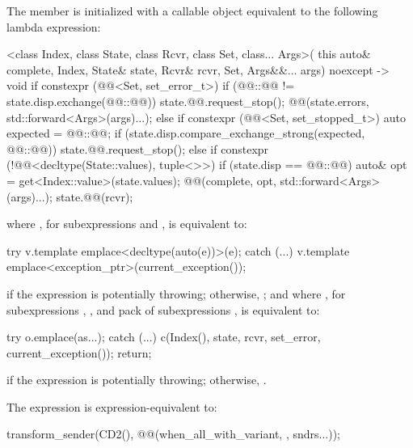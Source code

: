\pnum
The member 
is initialized with a callable object
equivalent to the following lambda expression:
\begin{codeblock}
[]<class Index, class State, class Rcvr, class Set, class... Args>(
    this auto& complete, Index, State& state, Rcvr& rcvr, Set, Args&&... args) noexcept -> void {
  if constexpr (@@<Set, set_error_t>) {
    if (@@::@@ != state.disp.exchange(@@::@@)) {
      state.@@.request_stop();
      @@(state.errors, std::forward<Args>(args)...);
    }
  } else if constexpr (@@<Set, set_stopped_t>) {
    auto expected = @@::@@;
    if (state.disp.compare_exchange_strong(expected, @@::@@)) {
      state.@@.request_stop();
    }
  } else if constexpr (!@@<decltype(State::values), tuple<>>) {
    if (state.disp == @@::@@) {
      auto& opt = get<Index::value>(state.values);
      @@(complete, opt, std::forward<Args>(args)...);
    }
  }
  state.@@(rcvr);
}
\end{codeblock}
where ,
for subexpressions  and , is equivalent to:
\begin{codeblock}
try {
  v.template emplace<decltype(auto(e))>(e);
} catch (...) {
  v.template emplace<exception_ptr>(current_exception());
}
\end{codeblock}
if the expression  is potentially throwing;
otherwise, ;
and where ,
for subexpressions , , and pack of subexpressions ,
is equivalent to:
\begin{codeblock}
try {
  o.emplace(as...);
} catch (...) {
  c(Index(), state, rcvr, set_error, current_exception());
  return;
}
\end{codeblock}
if the expression 
is potentially throwing;
otherwise, .

\pnum
The expression 
is expression-equivalent to:
\begin{codeblock}
transform_sender(CD2(), @@(when_all_with_variant, {}, sndrs...));
\end{codeblock}

